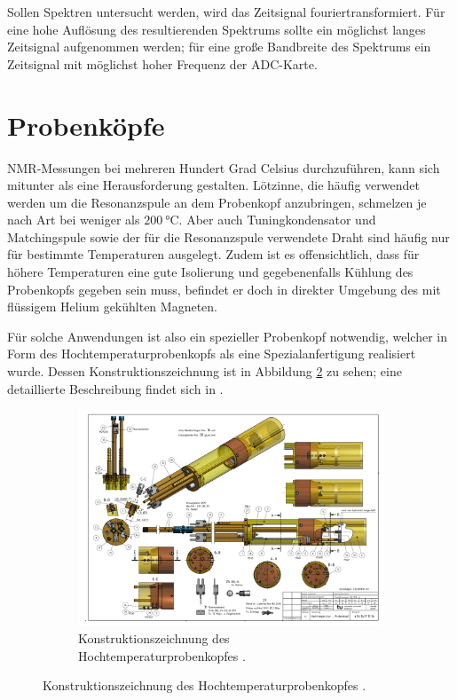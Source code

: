 Sollen Spektren untersucht werden, wird das Zeitsignal fouriertransformiert. Für eine hohe Auflösung des resultierenden Spektrums sollte ein möglichst langes Zeitsignal aufgenommen werden; für eine große Bandbreite des Spektrums ein Zeitsignal mit möglichst hoher Frequenz der ADC-Karte.



\section{Probenköpfe} \label{section:exp:probenkoepfe}

NMR-Messungen bei mehreren Hundert Grad Celsius durchzuführen, kann sich mitunter als eine Herausforderung gestalten. Lötzinne, die häufig verwendet werden um die Resonanzspule an dem Probenkopf anzubringen, schmelzen je nach Art bei weniger als $\SI{200}{\degreeCelsius}$. Aber auch Tuningkondensator und Match\-ing\-spu\-le sowie der für die Resonanzspule verwendete Draht sind häufig nur für bestimmte Temperaturen ausgelegt. Zudem ist es offensichtlich, dass für höhere Temperaturen eine gute Isolierung und gegebenenfalls Kühlung des Probenkopfs gegeben sein muss, befindet er doch in direkter Umgebung des mit flüssigem Helium gekühlten Magneten.

Für solche Anwendungen ist also ein spezieller Probenkopf notwendig, welcher in Form des Hochtemperaturprobenkopfs als eine Spezialanfertigung realisiert wurde. Dessen Konstruktionszeichnung ist in Abbildung \ref{fig:exp:ofen_aufbau} zu sehen; eine detaillierte Beschreibung findet sich in \cite{tilly_master}.

\begin{figure}
	\begin{figure}[H]
		\includegraphics[width=1.05\textheight]{graphics/ofen/ofen_aufbau2.pdf}
		\caption{Konstruktionszeichnung des Hochtemperaturprobenkopfes \cite{Rudloff_blue_print}.}
		\label{fig:exp:ofen_aufbau}
	\end{figure}
\end{figure}


